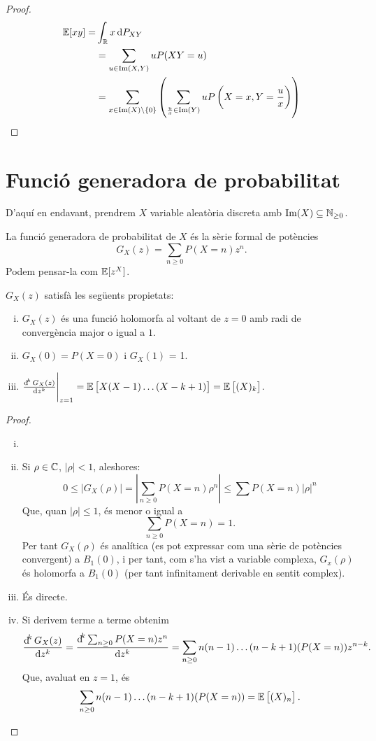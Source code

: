 \begin{proof}
    \[\begin{aligned}
    \esp[xy] =& \int_\real x\dif P_{XY} \\
    &= \sum_{u\in\im(X,Y)}{uP(XY=u)} \\
    &= \sum_{x\in\im(X)\setminus\{0\}} \lp\sum_{\frac{u}{x}\in\im(Y)} uP\lp X=x,Y=\frac{u}{x} \rp\rp
    \end{aligned}\]
\end{proof}


\section{Funció generadora de probabilitat}
D'aquí en endavant, prendrem $X$ variable aleatòria discreta amb $\operatorname{Im}(X) \subseteq \mathbb{N}_{\geq 0}$.
\begin{defi}
    La funció generadora de probabilitat de $X$ \'es la sèrie formal de potències
    \[G_X(z) = \sum_{n \geq 0} P(X = n) z^n.\]
    Podem pensar-la com $\operatorname{\mathbb{E}}[z^X]$.
\end{defi}

\begin{prop}
    $G_X(z)$ satisfà les següents propietats:
    \begin{enumerate}[i)]
    \item $G_X(z)$ \'es una funció holomorfa al voltant de $z = 0$ amb radi de convergència
        major o igual a $1$.
    \item $G_X(0) = P(X = 0)$ i $G_X(1)$ = 1.
    \item $\eval{\dv[k]{G_X(z)}{z}}_{z = 1} = 
        \esp\lb X(X-1)\dots(X-k+1)\rb = \esp \lb (X)_k\rb $.
    \end{enumerate}
\end{prop}

\begin{proof}
    \begin{enumerate}[i)]
        \item[]
        \item Si $\rho \in \mathbb{C}$, $|\rho| < 1$, aleshores:
            \[
                0 \leq |G_X(\rho)| = \left|\sum_{n \geq 0} P(X = n) \rho^n \right|
                \leq \sum P(X=n) |\rho|^n
            \]
            Que, quan $|\rho| \leq 1$, \'es menor o igual a
            \[
                \sum_{n \geq 0} P(X = n) = 1.
            \]
            Per tant $G_X(\rho)$ \'es analítica (es pot expressar com una sèrie de
            potències convergent) a $B_1(0)$, i per tant, com s'ha vist a variable
            complexa, $G_x(\rho)$ \'es holomorfa a $B_1(0)$ (per tant infinitament
            derivable en sentit complex).
        \item \'Es directe.
        \item Si derivem terme a terme obtenim
            \[
                \dv[k]{G_X(z)}{z} = \dv[k]{\sum_{n \geq 0} P(X = n) z^n}{z} =
                \sum_{n \geq 0} n(n-1)\dots(n-k+1)(P(X = n)) z^{n-k}.
            \]
            Que, avaluat en $z = 1$, \'es
            \[ 
                \sum_{n \geq 0} n(n-1)\dots(n-k+1)(P(X=n)) = \operatorname{\mathbb{E}}\left[(X)_n\right].
            \]
    \end{enumerate}
\end{proof}


